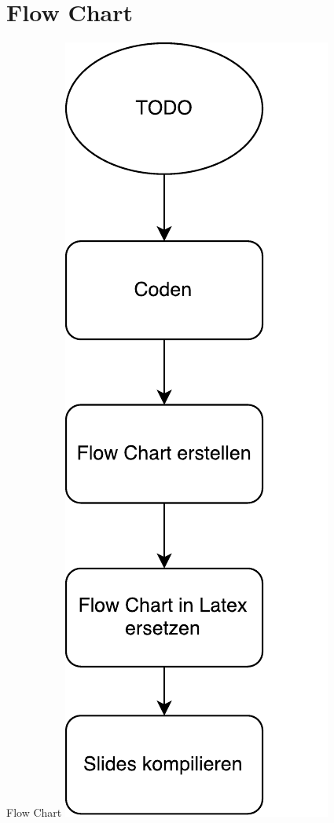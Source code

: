 \section{Flow Chart}
\begin{frame}{Flow Chart}
	\centering
  	\includegraphics[scale=0.3]{FlowChartTodo.pdf}
\end{frame}

